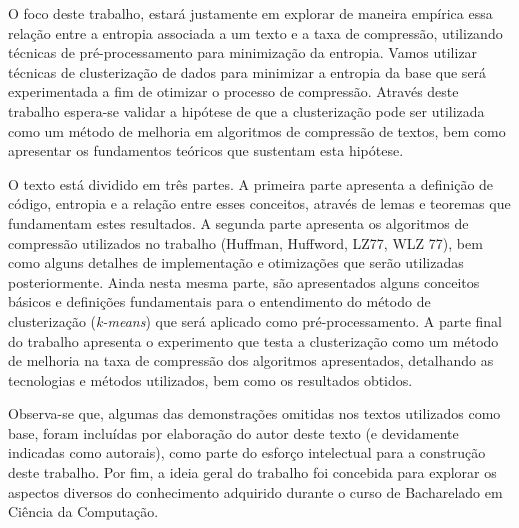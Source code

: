O foco deste trabalho, estará justamente em explorar de maneira empírica essa relação entre a entropia associada a um texto e a taxa de compressão, utilizando técnicas de pré-processamento para minimização da entropia. 
Vamos utilizar técnicas de clusterização de dados \cite{Goog} para minimizar a entropia da base que será experimentada a fim de otimizar o processo de compressão.
Através deste trabalho espera-se validar a hipótese de que a clusterização pode ser utilizada como um método de melhoria em algoritmos de compressão de textos, bem como apresentar os fundamentos teóricos que sustentam esta hipótese.

O texto está dividido em três partes.
 A primeira parte apresenta a definição de código, entropia e a relação entre esses conceitos, através de lemas e teoremas que fundamentam estes resultados.
 A segunda parte apresenta os algoritmos de compressão utilizados no trabalho (Huffman, Huffword, LZ77, WLZ 77), bem como alguns detalhes de implementação e otimizações que serão utilizadas posteriormente.
 Ainda nesta mesma parte, são apresentados alguns conceitos básicos e definições fundamentais para o entendimento do método de clusterização (\emph{k-means}) que será aplicado como pré-processamento.
 A parte final do trabalho apresenta o experimento que testa a clusterização como um método de melhoria na taxa de compressão dos algoritmos apresentados, detalhando as tecnologias e métodos utilizados, bem como os resultados obtidos.
 
 Observa-se que, algumas das demonstrações omitidas nos textos utilizados como base, foram incluídas por elaboração do autor deste texto (e devidamente indicadas como autorais), como parte do esforço intelectual para a construção deste trabalho.
 Por fim, a ideia geral do trabalho foi concebida para explorar os aspectos diversos do conhecimento adquirido durante o curso de Bacharelado em Ciência da Computação.
